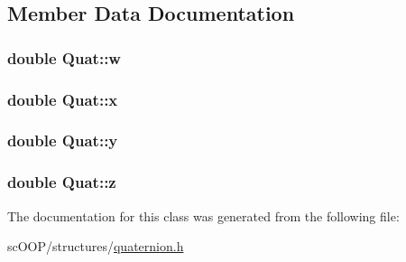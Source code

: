\subsection{Member Data Documentation}
\hypertarget{class_quat_a454a60ad9af1b3ca644b0026ba37a954}{
\subsubsection[{w}]{\setlength{\rightskip}{0pt plus 5cm}double Quat\+::w}}\label{class_quat_a454a60ad9af1b3ca644b0026ba37a954}
\hypertarget{class_quat_a6aa1caf29371ebc06326c4338731e39f}{
\subsubsection[{x}]{\setlength{\rightskip}{0pt plus 5cm}double Quat\+::x}}\label{class_quat_a6aa1caf29371ebc06326c4338731e39f}
\hypertarget{class_quat_a27a9f65a05aefe077c6651ccf91bdc00}{
\subsubsection[{y}]{\setlength{\rightskip}{0pt plus 5cm}double Quat\+::y}}\label{class_quat_a27a9f65a05aefe077c6651ccf91bdc00}
\hypertarget{class_quat_af98d19071354075f7f8eb55219bb478a}{
\subsubsection[{z}]{\setlength{\rightskip}{0pt plus 5cm}double Quat\+::z}}\label{class_quat_af98d19071354075f7f8eb55219bb478a}


The documentation for this class was generated from the following file\+:\begin{DoxyCompactItemize}
\item 
sc\+O\+O\+P/structures/\hyperlink{quaternion_8h}{quaternion.\+h}\end{DoxyCompactItemize}
